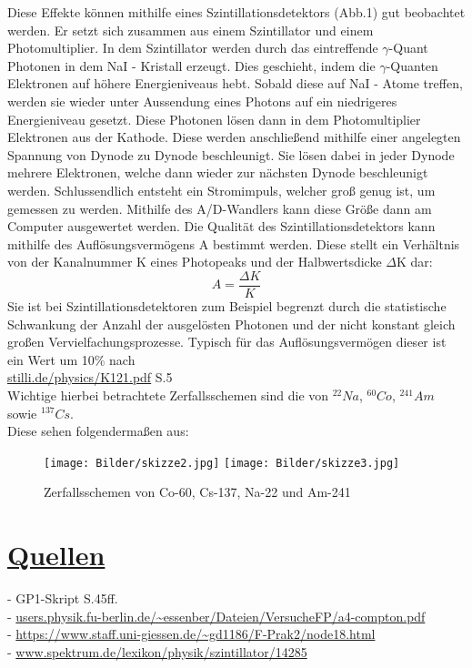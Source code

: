 \documentclass[11pt,a4paper]{article}
\begin{document}
  Diese Effekte k\"onnen mithilfe eines Szintillationsdetektors (Abb.1) gut beobachtet werden. Er setzt sich zusammen aus
  einem Szintillator und einem Photomultiplier. 
  In dem Szintillator werden durch das eintreffende $\gamma$-Quant Photonen in dem NaI - Kristall erzeugt. 
  Dies geschieht, indem die $\gamma$-Quanten Elektronen auf höhere Energieniveaus hebt. 
  Sobald diese auf NaI - Atome treffen, werden sie wieder unter Aussendung eines Photons auf ein niedrigeres Energieniveau gesetzt. Diese Photonen lösen 
  dann in dem Photomultiplier Elektronen aus der Kathode. Diese werden anschließend mithilfe einer angelegten Spannung von Dynode zu Dynode beschleunigt. 
  Sie lösen dabei in jeder Dynode mehrere Elektronen, welche dann wieder zur nächsten Dynode beschleunigt werden. 
  Schlussendlich entsteht ein Stromimpuls, welcher groß genug ist, um gemessen zu werden. 
  Mithilfe des A/D-Wandlers kann diese Größe dann am Computer ausgewertet werden.
  Die Qualität des Szintillationsdetektors kann mithilfe des Auflösungsvermögens A bestimmt werden. Diese stellt ein Verhältnis von der Kanalnummer K eines Photopeaks und der Halbwertsdicke $\Delta$K dar:
  \begin{equation}
  	A = \frac{\Delta K}{K} \label{Auflosung}
  \end{equation}
  Sie ist bei Szintillationsdetektoren zum Beispiel begrenzt durch die statistische Schwankung der Anzahl der ausgel\"osten Photonen und der nicht konstant gleich gro\ss en Vervielfachungsprozesse. Typisch f\"ur das Aufl\"osungsverm\"ogen dieser ist ein Wert um 10\% nach \\
  \url{stilli.de/physics/K121.pdf} S.5
  \\ Wichtige hierbei betrachtete Zerfallsschemen sind die von $^{22}{Na}$, $^{60}{Co}$, $^{241}{Am}$ sowie $^{137}{Cs}$. \\ Diese sehen folgenderma\ss en aus:  
 
 \begin{figure}[H]
 \center  
  \texttt{[image: Bilder/skizze2.jpg]}
  \texttt{[image: Bilder/skizze3.jpg]}
  \caption{Zerfallsschemen von Co-60, Cs-137, Na-22 und Am-241}
 \end{figure}  
  \section{\underline{Quellen}}
  - GP1-Skript S.45ff.
  \\- \url{users.physik.fu-berlin.de/~essenber/Dateien/VersucheFP/a4-compton.pdf}
  \\- \url{https://www.staff.uni-giessen.de/~gd1186/F-Prak2/node18.html}
  \\- \url{www.spektrum.de/lexikon/physik/szintillator/14285}
\end{document}
